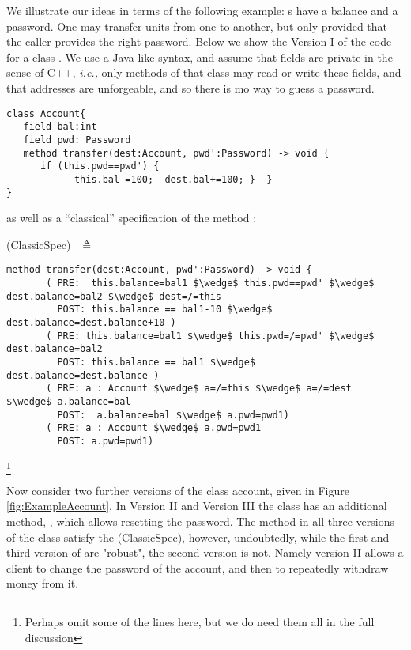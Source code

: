  We illustrate our ideas in terms of the following example:
 s have a balance and a 
password. One may transfer  units from one  to another, but only provided
that  the caller provides the right password. Below we show the Version I of the code for 
a class . 
We use a Java-like syntax,  and assume that fields are private in the sense of C++, \emph{i.e.,}
 only methods of that class may read or write these fields,
 and   that addresses are unforgeable, and so  there is mo way to guess a password.

 

\begin{lstlisting}
class Account{
   field bal:int 
   field pwd: Password 
   method transfer(dest:Account, pwd':Password) -> void {
      if (this.pwd==pwd') {
            this.bal-=100;  dest.bal+=100; }  }
}
\end{lstlisting}

as well as a ``classical'' specification of the method :

 (ClassicSpec)$  \ \ $  $\triangleq$

\begin{lstlisting}[mathescape=true, frame=lines]
  method transfer(dest:Account, pwd':Password) -> void {
       ( PRE:  this.balance=bal1 $\wedge$ this.pwd==pwd' $\wedge$ dest.balance=bal2 $\wedge$ dest=/=this 
         POST: this.balance == bal1-10 $\wedge$  dest.balance=dest.balance+10 )
       ( PRE: this.balance=bal1 $\wedge$ this.pwd=/=pwd' $\wedge$ dest.balance=bal2
         POST: this.balance == bal1 $\wedge$  dest.balance=dest.balance )
       ( PRE: a : Account $\wedge$ a=/=this $\wedge$ a=/=dest  $\wedge$ a.balance=bal  
         POST:  a.balance=bal $\wedge$ a.pwd=pwd1)
       ( PRE: a : Account $\wedge$ a.pwd=pwd1  
         POST: a.pwd=pwd1)       
\end{lstlisting}\footnote{Perhaps omit some of the lines here, but we do need them all in the full discussion}
  
 
  
 
 Now consider two further versions of the class account, given in Figure \ref{fig:ExampleAccount}.
 In Version II and Version III the class has an additional method, , which allows resetting
 the password.
The method  in all three versions of the class  satisfy the (ClassicSpec), 
however, undoubtedly, while the first and third version of  are "robust", the second version is not.
Namely version II allows a client to change the password of the account, and then to repeatedly withdraw 
money from it.
  
